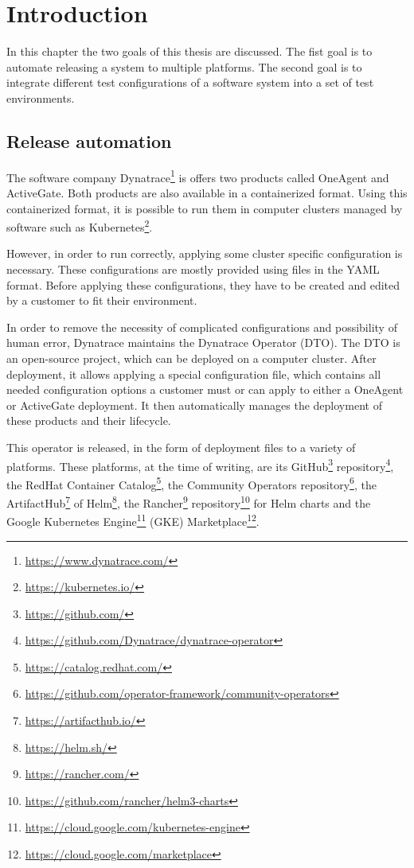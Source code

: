 \chapter{Introduction}
\label{ch:introduction}

In this chapter the two goals of this thesis are discussed.
The fist goal is to automate releasing a system to multiple platforms.
The second goal is to integrate different test configurations of a software system into a set of test environments.



\section{Release automation}
\label{sec:introduction:release-automation}

The software company Dynatrace\footnote{\url{https://www.dynatrace.com/}} is offers two products called OneAgent and ActiveGate.
Both products are also available in a containerized format.
Using this containerized format, it is possible to run them in computer clusters managed by software such as Kubernetes\footnote{\url{https://kubernetes.io/}}.

However, in order to run correctly, applying some cluster specific configuration is necessary.
These configurations are mostly provided using files in the YAML format\cite{UnderstandingKubernetesObjects}.
Before applying these configurations, they have to be created and edited by a customer to fit their environment.

In order to remove the necessity of complicated configurations and possibility of human error, Dynatrace maintains the Dynatrace Operator (DTO).
The DTO is an open-source project, which can be deployed on a computer cluster.
After deployment, it allows applying a special configuration file, which contains all needed configuration options a customer must or can apply to either a OneAgent or ActiveGate deployment.
It then automatically manages the deployment of these products and their lifecycle.

This operator\cite{OperatorPattern} is released, in the form of deployment files to a variety of platforms.
These platforms, at the time of writing, are
its GitHub\footnote{\url{https://github.com/}} repository\footnote{\url{https://github.com/Dynatrace/dynatrace-operator}},
the RedHat Container Catalog\footnote{\url{https://catalog.redhat.com/}},
the Community Operators repository\footnote{\url{https://github.com/operator-framework/community-operators}},
the ArtifactHub\footnote{\url{https://artifacthub.io/}} of Helm\footnote{\url{https://helm.sh/}},
the Rancher\footnote{\url{https://rancher.com/}} repository\footnote{\url{https://github.com/rancher/helm3-charts}} for Helm charts and
the Google Kubernetes Engine\footnote{\url{https://cloud.google.com/kubernetes-engine}} (GKE) Marketplace\footnote{\url{https://cloud.google.com/marketplace}}.

